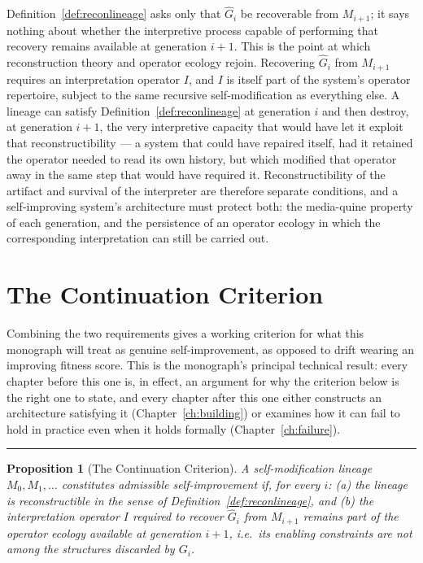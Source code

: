 \documentclass[11pt]{book}
\newtheorem{proposition}[definition]{Proposition}
\begin{document}
Definition~\ref{def:reconlineage} asks only that $\widehat{G}_i$ be recoverable from $M_{i+1}$; it says nothing about whether the interpretive process capable of performing that recovery remains available at generation $i+1$. This is the point at which reconstruction theory and operator ecology rejoin. Recovering $\widehat{G}_i$ from $M_{i+1}$ requires an interpretation operator $I$, and $I$ is itself part of the system's operator repertoire, subject to the same recursive self-modification as everything else. A lineage can satisfy Definition~\ref{def:reconlineage} at generation $i$ and then destroy, at generation $i+1$, the very interpretive capacity that would have let it exploit that reconstructibility --- a system that could have repaired itself, had it retained the operator needed to read its own history, but which modified that operator away in the same step that would have required it. Reconstructibility of the artifact and survival of the interpreter are therefore separate conditions, and a self-improving system's architecture must protect both: the media-quine property of each generation, and the persistence of an operator ecology in which the corresponding interpretation can still be carried out.

\section{The Continuation Criterion}

Combining the two requirements gives a working criterion for what this monograph will treat as genuine self-improvement, as opposed to drift wearing an improving fitness score. This is the monograph's principal technical result: every chapter before this one is, in effect, an argument for why the criterion below is the right one to state, and every chapter after this one either constructs an architecture satisfying it (Chapter~\ref{ch:building}) or examines how it can fail to hold in practice even when it holds formally (Chapter~\ref{ch:failure}).

\begin{center}
\rule{0.4\linewidth}{0.4pt}
\end{center}

\begin{proposition}[The Continuation Criterion]
\label{prop:sufficient}
A self-modification lineage $M_0, M_1, \dots$ constitutes admissible self-improvement if, for every $i$: (a) the lineage is reconstructible in the sense of Definition~\ref{def:reconlineage}, and (b) the interpretation operator $I$ required to recover $\widehat{G}_i$ from $M_{i+1}$ remains part of the operator ecology available at generation $i+1$, i.e.\ its enabling constraints are not among the structures discarded by $G_i$.
\end{proposition}
\end{document}
